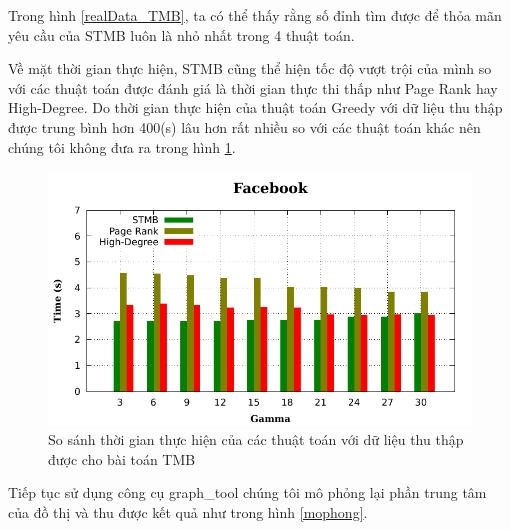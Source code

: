 \begin{itemize}
	Trong hình \ref{realData_TMB}, ta có thể thấy rằng số đỉnh tìm được để thỏa mãn yêu cầu của STMB luôn là nhỏ nhất trong 4 thuật toán. 
	
	Về mặt thời gian thực hiện, STMB cũng thể hiện tốc độ vượt trội của mình so với các thuật toán được đánh giá là thời gian thực thi thấp như Page Rank hay High-Degree. Do thời gian thực hiện của thuật toán Greedy với dữ liệu thu thập được trung bình hơn 400(s) lâu hơn rất nhiều so với các thuật toán khác nên chúng tôi không đưa ra trong hình \ref{timeface}.
	\begin{center}
		\begin{figure}[H]
			\begin{center}
				\includegraphics [scale=1]{picture/TimeFacebook}
			\end{center}
			\caption{So sánh thời gian thực hiện của các thuật toán với dữ liệu thu thập được cho bài toán TMB}
			\label{timeface}
		\end{figure}
	\end{center}
	
	Tiếp tục sử dụng công cụ graph\_tool chúng tôi mô phỏng lại phần trung tâm của đồ thị  và thu được kết quả như trong hình \ref{mophong}.
	

\end{itemize}
